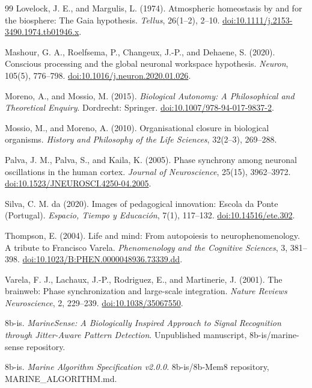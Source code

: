 \documentclass[11pt]{article}
\begin{document}
\begin{thebibliography}{99}
Lovelock, J. E., and Margulis, L. (1974). Atmospheric homeostasis by and for the biosphere: The Gaia hypothesis. \emph{Tellus}, 26(1--2), 2--10. \href{https://doi.org/10.1111/j.2153-3490.1974.tb01946.x}{doi:10.1111/j.2153-3490.1974.tb01946.x}.

Mashour, G. A., Roelfsema, P., Changeux, J.-P., and Dehaene, S. (2020). Conscious processing and the global neuronal workspace hypothesis. \emph{Neuron}, 105(5), 776--798. \href{https://doi.org/10.1016/j.neuron.2020.01.026}{doi:10.1016/j.neuron.2020.01.026}.

Moreno, A., and Mossio, M. (2015). \emph{Biological Autonomy: A Philosophical and Theoretical Enquiry}. Dordrecht: Springer. \href{https://doi.org/10.1007/978-94-017-9837-2}{doi:10.1007/978-94-017-9837-2}.

Mossio, M., and Moreno, A. (2010). Organisational closure in biological organisms. \emph{History and Philosophy of the Life Sciences}, 32(2--3), 269--288.

Palva, J. M., Palva, S., and Kaila, K. (2005). Phase synchrony among neuronal oscillations in the human cortex. \emph{Journal of Neuroscience}, 25(15), 3962--3972. \href{https://doi.org/10.1523/JNEUROSCI.4250-04.2005}{doi:10.1523/JNEUROSCI.4250-04.2005}.

Silva, C. M. da (2020). Images of pedagogical innovation: Escola da Ponte (Portugal). \emph{Espacio, Tiempo y Educación}, 7(1), 117--132. \href{https://doi.org/10.14516/ete.302}{doi:10.14516/ete.302}.

Thompson, E. (2004). Life and mind: From autopoiesis to neurophenomenology. A tribute to Francisco Varela. \emph{Phenomenology and the Cognitive Sciences}, 3, 381--398. \href{https://doi.org/10.1023/B:PHEN.0000048936.73339.dd}{doi:10.1023/B:PHEN.0000048936.73339.dd}.

Varela, F. J., Lachaux, J.-P., Rodriguez, E., and Martinerie, J. (2001). The brainweb: Phase synchronization and large-scale integration. \emph{Nature Reviews Neuroscience}, 2, 229--239. \href{https://doi.org/10.1038/35067550}{doi:10.1038/35067550}.

8b-is. \emph{MarineSense: A Biologically Inspired Approach to Signal Recognition through Jitter-Aware Pattern Detection}. Unpublished manuscript, 8b-is/marine-sense repository.

8b-is. \emph{Marine Algorithm Specification v2.0.0}. 8b-is/8b-Mem8 repository, MARINE\_ALGORITHM.md.


\end{thebibliography}
\end{document}

